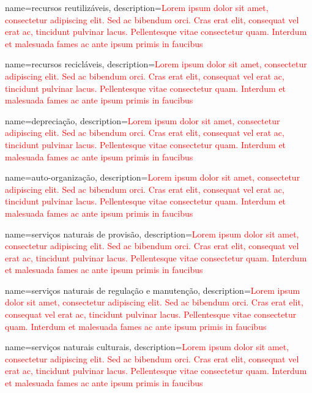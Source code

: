 {
	name=recursos reutilizáveis,
	description={\textcolor{red}{Lorem ipsum dolor sit amet, consectetur adipiscing elit. Sed ac bibendum orci. Cras erat elit, consequat vel erat ac, tincidunt pulvinar lacus. Pellentesque vitae consectetur quam. Interdum et malesuada fames ac ante ipsum primis in faucibus}}
}

{
	name=recursos recicláveis,
	description={\textcolor{red}{Lorem ipsum dolor sit amet, consectetur adipiscing elit. Sed ac bibendum orci. Cras erat elit, consequat vel erat ac, tincidunt pulvinar lacus. Pellentesque vitae consectetur quam. Interdum et malesuada fames ac ante ipsum primis in faucibus}}
}

{
	name=depreciação,
	description={\textcolor{red}{Lorem ipsum dolor sit amet, consectetur adipiscing elit. Sed ac bibendum orci. Cras erat elit, consequat vel erat ac, tincidunt pulvinar lacus. Pellentesque vitae consectetur quam. Interdum et malesuada fames ac ante ipsum primis in faucibus}}
}

{
	name=auto-organização,
	description={\textcolor{red}{Lorem ipsum dolor sit amet, consectetur adipiscing elit. Sed ac bibendum orci. Cras erat elit, consequat vel erat ac, tincidunt pulvinar lacus. Pellentesque vitae consectetur quam. Interdum et malesuada fames ac ante ipsum primis in faucibus}}
}

{
	name=serviços naturais de provisão,
	description={\textcolor{red}{Lorem ipsum dolor sit amet, consectetur adipiscing elit. Sed ac bibendum orci. Cras erat elit, consequat vel erat ac, tincidunt pulvinar lacus. Pellentesque vitae consectetur quam. Interdum et malesuada fames ac ante ipsum primis in faucibus}}
}

{
	name=serviços naturais de regulação e manutenção,
	description={\textcolor{red}{Lorem ipsum dolor sit amet, consectetur adipiscing elit. Sed ac bibendum orci. Cras erat elit, consequat vel erat ac, tincidunt pulvinar lacus. Pellentesque vitae consectetur quam. Interdum et malesuada fames ac ante ipsum primis in faucibus}}
}

{
	name=serviços naturais culturais,
	description={\textcolor{red}{Lorem ipsum dolor sit amet, consectetur adipiscing elit. Sed ac bibendum orci. Cras erat elit, consequat vel erat ac, tincidunt pulvinar lacus. Pellentesque vitae consectetur quam. Interdum et malesuada fames ac ante ipsum primis in faucibus}}
}

